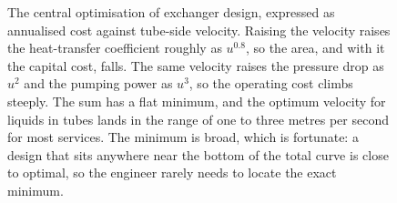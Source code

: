 \begin{figure}[htbp]
\centering
{}
\caption[Heat-transfer versus pressure-drop cost trade-off]{The central
optimisation of exchanger design, expressed as annualised cost against tube-side
velocity. Raising the velocity raises the heat-transfer coefficient roughly as
$u^{0.8}$, so the area, and with it the capital cost, falls. The same velocity
raises the pressure drop as $u^2$ and the pumping power as $u^3$, so the
operating cost climbs steeply. The sum has a flat minimum, and the optimum
velocity for liquids in tubes lands in the range of one to three metres per
second for most services. The minimum is broad, which is fortunate: a design that
sits anywhere near the bottom of the total curve is close to optimal, so the
engineer rarely needs to locate the exact minimum.}
\label{fig:vol04ch06:pressure-drop-tradeoff}
\end{figure}
